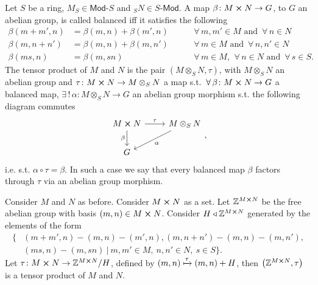 \begin{defn}
	Let $S$ be a ring, $M_S \in \mathsf{Mod}\text{-}S$ and ${}_SN \in S\text{-}\mathsf{Mod}$.
	A map $\beta\colon M \cross N \to G$, to $G$ an abelian group, is called balanced iff
	it satisfies the following
	\begin{align}
		\beta(m + m', n) &= \beta(m,n) + \beta(m',n) \qquad & \,\forall\, m, m' \in M \text{ and } \,\forall\, n \in N\\
		\beta(m, n + n') &= \beta(m,n) + \beta(m,n') \qquad & \,\forall\, m \in M \text{ and } \,\forall\, n, n' \in N\\
		\beta(ms, n) &= \beta(m,sn) \qquad & \,\forall\, m \in M,\ \,\forall\, n \in N \text{ and } \,\forall\, s \in S
	.\end{align} 
	The tensor product of $M$ and $N$ is the pair $\left(M \otimes_{S} N, \tau \right)$,
	with $M \otimes_{S} N$ an abelian group and $\tau\colon M \cross N \to M \otimes_{S} N$ a map s.t.
	$\,\forall\, \beta\colon M \cross N \to G$ a balanced map, $\exists\, !\, \alpha\colon M \otimes_{S} N \to G$ an abelian group morphism
	s.t. the following diagram commutes
	\begin{equation}
	\begin{tikzcd}
		M \cross N \arrow[r, "\tau", rightarrow] \arrow[d, "\beta"', rightarrow] &
		M \otimes_{S} N \arrow[dl, "\alpha", rightarrow] \\
		G &
	\end{tikzcd}
	,\end{equation} 
	i.e. s.t. $\alpha \circ \tau = \beta$.
	In such a case we say that every balanced map $\beta$ factors through $\tau$ via an abelian group morphism.
\end{defn}

\begin{rem}
	Consider $M$ and $N$ as before.
	Consider $M \cross N$ as a set.
	Let $\mathbb{Z}^{M \cross N}$ be the free abelian group with basis $\left(m, n\right) \in M \cross N$.
	Consider $H \triangleleft \mathbb{Z}^{M \cross N}$ generated by the elements of the form
	\begin{align}
		\big\{& \left(m + m', n\right) - \left(m, n\right) - \left(m',n \right),
	\left(m, n + n'\right) - \left(m, n\right) - \left(m, n'\right),\\
		      &\left(ms, n\right) - \left(m, sn\right)
		     \ \big|\ m,m' \in M,\ n,n' \in N,\ s \in S \big\}
	.\end{align} 
	Let $\tau\colon M \cross N \to \mathbb{Z}^{M \cross N}/H$, defined by $\left(m, n\right) \xmapsto{\tau} \left(m, n\right) + H$,
	then $\left(\mathbb{Z}^{M \cross N}, \tau\right)$ is a tensor product of $M$ and $N$.
\end{rem}


